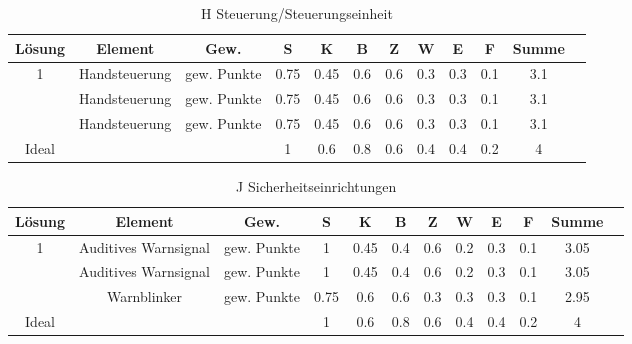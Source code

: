 \documentclass[10pt,a4paper]{article}
\begin{document}
\begin{table}[h!]
    \centering
    \begin{tabular}{cccccccccccc}
        \toprule
        \textbf{Lösung} & \textbf{Element} & \textbf{Gew.} & \textbf{S} & \textbf{K} & \textbf{B} & \textbf{Z} & \textbf{W} & \textbf{E} & \textbf{F} & \textbf{Summe} & \\
        \midrule
        1               & Handsteuerung    & gew. Punkte   & 0.75       & 0.45       & 0.6        & 0.6        & 0.3        & 0.3        & 0.1        & 3.1              \\
        \addlinespace
        2               & Handsteuerung    & gew. Punkte   & 0.75       & 0.45       & 0.6        & 0.6        & 0.3        & 0.3        & 0.1        & 3.1              \\
        \addlinespace
        3               & Handsteuerung    & gew. Punkte   & 0.75       & 0.45       & 0.6        & 0.6        & 0.3        & 0.3        & 0.1        & 3.1              \\
        \midrule
        Ideal           &                  &               & 1          & 0.6        & 0.8        & 0.6        & 0.4        & 0.4        & 0.2        & 4                \\
        \bottomrule
    \end{tabular}
    \caption{H Steuerung/Steuerungseinheit}
    \label{tab:steuerung}
\end{table}


\begin{table}[h!]
    \centering
    \begin{tabular}{cccccccccccc}
        \toprule
        \textbf{Lösung} & \textbf{Element}     & \textbf{Gew.} & \textbf{S} & \textbf{K} & \textbf{B} & \textbf{Z} & \textbf{W} & \textbf{E} & \textbf{F} & \textbf{Summe} & \\
        \midrule
        1               & Auditives Warnsignal & gew. Punkte   & 1          & 0.45       & 0.4        & 0.6        & 0.2        & 0.3        & 0.1        & 3.05             \\
        \addlinespace
        2               & Auditives Warnsignal & gew. Punkte   & 1          & 0.45       & 0.4        & 0.6        & 0.2        & 0.3        & 0.1        & 3.05             \\
        \addlinespace
        3               & Warnblinker          & gew. Punkte   & 0.75       & 0.6        & 0.6        & 0.3        & 0.3        & 0.3        & 0.1        & 2.95             \\
        \midrule
        Ideal           &                      &               & 1          & 0.6        & 0.8        & 0.6        & 0.4        & 0.4        & 0.2        & 4                \\
        \bottomrule
    \end{tabular}
    \caption{J Sicherheitseinrichtungen}
    \label{tab:sicherheitseinrichtungen}
\end{table}
\end{document}
